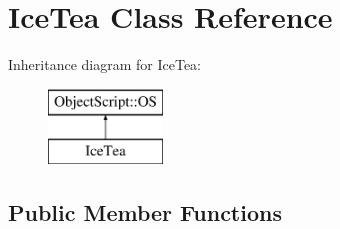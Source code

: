 \hypertarget{class_ice_tea}{}\section{Ice\+Tea Class Reference}
\label{class_ice_tea}
Inheritance diagram for Ice\+Tea\+:\begin{figure}[H]
\begin{center}
\leavevmode
\includegraphics[height=2.000000cm]{class_ice_tea}
\end{center}
\end{figure}
\subsection*{Public Member Functions}
